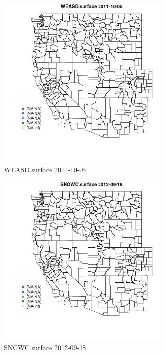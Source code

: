 \begin{figure} 
\centering  
\includegraphics[width=0.77\textwidth]{Code_Outputs/ML_input_report_ML_input_PM25_Step5_part_d_de_duplicated_aves_ML_input_MapObsWEASDsurface2011-10-05.jpg} 
\caption{\label{fig:ML_input_report_ML_input_PM25_Step5_part_d_de_duplicated_aves_ML_inputMapObsWEASDsurface2011-10-05}WEASD.surface 2011-10-05} 
\end{figure} 
 

\begin{figure} 
\centering  
\includegraphics[width=0.77\textwidth]{Code_Outputs/ML_input_report_ML_input_PM25_Step5_part_d_de_duplicated_aves_ML_input_MapObsSNOWCsurface2012-09-18.jpg} 
\caption{\label{fig:ML_input_report_ML_input_PM25_Step5_part_d_de_duplicated_aves_ML_inputMapObsSNOWCsurface2012-09-18}SNOWC.surface 2012-09-18} 
\end{figure} 
 

